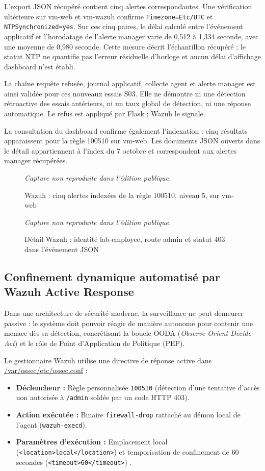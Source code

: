 \documentclass[a4paper,12pt]{report}
\newcommand{\publiccapture}[1]{%
  \begin{figure}[H]\centering
  {\footnotesize\itshape Capture non reproduite dans l'édition publique.}
  \caption{#1}\end{figure}}
\begin{document}
L'export JSON récupéré contient cinq alertes correspondantes. Une vérification ultérieure sur vm-web et vm-wazuh confirme \texttt{Timezone=Etc/UTC} et \texttt{NTPSynchronized=yes}. Sur ces cinq paires, le délai calculé entre l'événement applicatif et l'horodatage de l'alerte manager varie de 0,512 à 1,334 seconde, avec une moyenne de 0,980 seconde. Cette mesure décrit l'échantillon récupéré ; le statut NTP ne quantifie pas l'erreur résiduelle d'horloge et aucun délai d'affichage dashboard n'est établi.

La chaîne requête refusée, journal applicatif, collecte agent et alerte manager est ainsi validée pour ces nouveaux essais S03. Elle ne démontre ni une détection rétroactive des essais antérieurs, ni un taux global de détection, ni une réponse automatique. Le refus est appliqué par Flask ; Wazuh le signale.

La consultation du dashboard confirme également l'indexation : cinq résultats apparaissent pour la règle 100510 sur vm-web. Les documents JSON ouverts dans le détail appartiennent à l'index du 7 octobre et correspondent aux alertes manager récupérées.
\publiccapture{Wazuh : cinq alertes indexées de la règle 100510, niveau 5, sur vm-web}
\publiccapture{Détail Wazuh : identité lab-employee, route admin et statut 403 dans l'événement JSON}

\subsection{Confinement dynamique automatisé par Wazuh Active Response}
Dans une architecture de sécurité moderne, la surveillance ne peut demeurer passive : le système doit pouvoir réagir de manière autonome pour contenir une menace dès sa détection, concrétisant la boucle OODA (\textit{Observe-Orient-Decide-Act}) et le rôle de Point d'Application de Politique (PEP).

Le gestionnaire Wazuh utilise une directive de réponse active dans \url{/var/ossec/etc/ossec.conf} :
\begin{itemize}
\item \textbf{Déclencheur :} Règle personnalisée \texttt{100510} (détection d'une tentative d'accès non autorisée à \texttt{/admin} soldée par un code HTTP 403).
\item \textbf{Action exécutée :} Binaire \texttt{firewall-drop} rattaché au démon local de l'agent (\texttt{wazuh-execd}).
\item \textbf{Paramètres d'exécution :} Emplacement local (\texttt{<location>local</location>}) et temporisation de confinement de 60 secondes (\texttt{<timeout>60</timeout>}) \cite{arwhitelist}.
\end{itemize}
\end{document}
